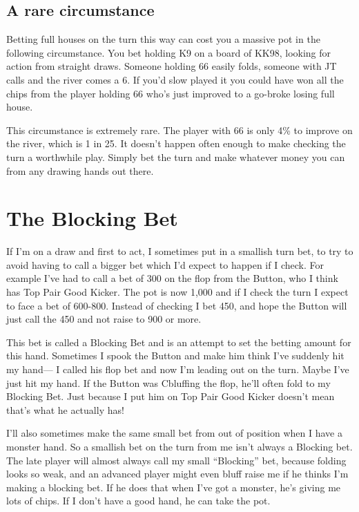 \subsection*{A rare circumstance}

Betting full houses on the turn this way can cost you a massive pot in
the following circumstance. You bet holding K9 on a board
of KK98, looking for action from straight draws. Someone
holding 66 easily folds, someone with JT calls and the river comes
a 6. If you'd slow played it you could have won all the chips from
the player holding 66 who's just improved to a go-broke losing full
house.

This circumstance is extremely rare. The player with 66 is only 4\% to
improve on the river, which is 1 in 25. It doesn't happen often enough
to make checking the turn a worthwhile play. Simply bet
the turn and make whatever money you can from any drawing hands
out there.

\section{The Blocking Bet}

If I'm on a draw and first to act, I sometimes put in a smallish
turn bet, to try to avoid having to call a bigger bet which
I'd expect to happen if I check. For example I've had to call a bet
of 300 on the flop from the Button, who I think has Top Pair
Good Kicker. The pot is now 1,000 and if I check the turn I expect to
face a bet of 600-800. Instead of checking I bet 450, and hope the Button
will just call the 450 and not raise to 900 or more.

This bet is called a Blocking Bet and is an attempt to set the betting
amount for this hand. Sometimes I spook the Button and make him think I've
suddenly hit my hand--- I called his flop bet and now I'm leading out
on the turn. Maybe I've just hit my hand. If the Button was Cbluffing
the flop, he'll often fold to my Blocking Bet. Just because I put him
on Top Pair Good Kicker doesn't mean that's what he actually has!

I'll also sometimes make the same small bet from out of position
when I have a monster hand. So a smallish bet on the turn from me
isn't always a Blocking bet. The late player will almost always call
my small ``Blocking'' bet, because folding looks so weak, and an
advanced player might even bluff raise me if he thinks I'm making
a blocking bet. If he does that when I've got a monster, he's giving
me lots of chips. If I don't have a good hand, he can take the pot.

